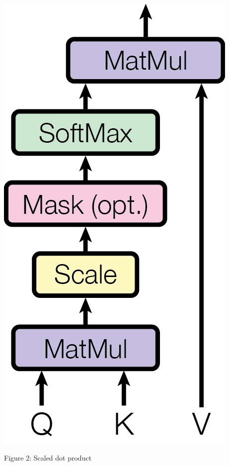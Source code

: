 \documentclass{article}
\begin{document}


\begin{minipage}{0.35\textwidth}
 \centering
 \includegraphics[width=1\linewidth]{dot_product.png}
 \caption{Figure 2: Scaled dot product}
 \label{fig:scaled_dot_product}
\end{minipage}\hfill
\end{document}
